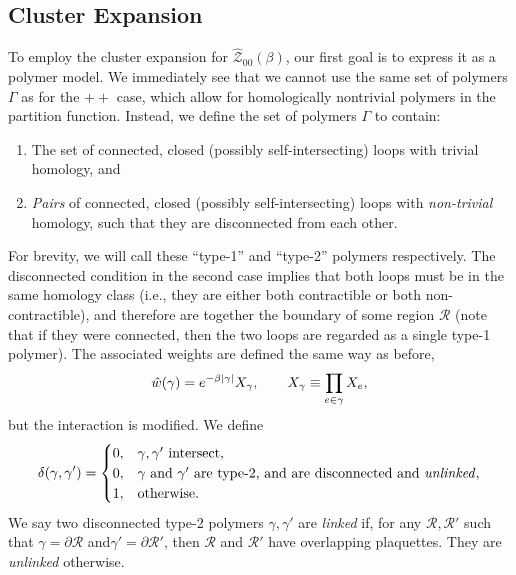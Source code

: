 \subsection{Cluster Expansion}
To employ the cluster expansion for $\hat{\mathcal{Z}}_{00}(\beta)$, our first goal is to express it as a polymer model. We immediately see that we cannot use the same set of polymers $\Gamma$ as for the $++$ case, which allow for homologically nontrivial polymers in the partition function. Instead, we define the set of polymers $\Gamma$ to contain:
\begin{enumerate}
    \item The set of connected, closed (possibly self-intersecting) loops with trivial homology, and
    \item \emph{Pairs} of connected, closed (possibly self-intersecting) loops with \emph{non-trivial} homology, such that they are disconnected from each other. 
\end{enumerate}
For brevity, we will call these ``type-1'' and ``type-2'' polymers respectively. The disconnected condition in the second case implies that both loops must be in the same homology class (i.e., they are either both contractible or both non-contractible), and therefore are together the boundary of some region $\mathcal{R}$ (note that if they were connected, then the two loops are regarded as a single type-1 polymer). The associated weights are defined the same way as before,
\begin{equation}
    \hat{w}(\gamma) = e^{-\beta \abs{\gamma}} X_{\gamma}, \qquad X_\gamma \equiv \prod_{e \in \gamma} X_e,
\end{equation}
but the interaction is modified. We define 
\begin{equation}\label{eqn:deltadef00}
    \delta(\gamma, \gamma') = \begin{cases}
        0, & \gamma, \gamma' \text{ intersect,} \\
        0, & \gamma \text{ and } \gamma' \text{ are type-2, and are disconnected and \emph{unlinked}}, \\
        1, & \text{otherwise.}
    \end{cases}
\end{equation}
We say two disconnected type-2 polymers $\gamma, \gamma'$ are \emph{linked} if, for any $\mathcal{R},\mathcal{R}'$ such that $\gamma = \partial \mathcal{R}$ and$\gamma' = \partial\mathcal{R}'$, then $\mathcal{R}$ and $\mathcal{R'}$ have overlapping plaquettes. They are \emph{unlinked} otherwise. 

